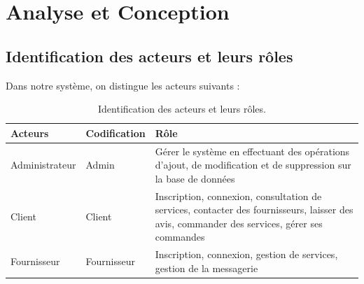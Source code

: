 \documentclass[french]{report}
\begin{document}



\chapter{Analyse et Conception}


\section{Identification des acteurs et leurs rôles }
Dans notre système, on distingue les acteurs suivants :

    \begin{table}[h!]
    \centering
    \begin{tabular}{ |m{3cm}|m{3cm}|m{5.5cm}| }
    \hline
    \textbf{Acteurs} & \textbf{Codification} & \textbf{Rôle} \\
    \hline
    Administrateur & Admin & Gérer le système en effectuant des opérations d'ajout,
    de modification et de suppression sur la base de données \\
    \hline
    Client & Client & Inscription, connexion, consultation de services, contacter des fournisseurs,
    laisser des avis, commander des services, gérer ses commandes \\
    \hline
    Fournisseur & Fournisseur & Inscription, connexion, gestion de services, gestion de la messagerie \\
    \hline
    \end{tabular}
    \caption{Identification des acteurs et leurs rôles.}
    \label{Tableaux:1}
    \end{table}
\end{document}
